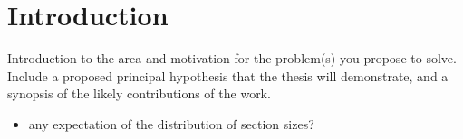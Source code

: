 \section{Introduction}
Introduction to the area and motivation for the problem(s) you
propose to solve.  Include a proposed principal hypothesis that the
thesis will demonstrate, and a synopsis of the likely contributions of
the work.

\begin{itemize}
\item any expectation of the distribution of section sizes?
\end{itemize}